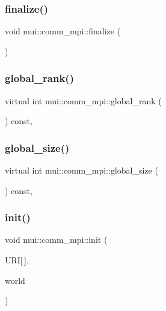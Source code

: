 \subsubsection{\texorpdfstring{finalize()}{finalize()}}
{\footnotesize\ttfamily void mui\+::comm\+\_\+mpi\+::finalize (\begin{DoxyParamCaption}{ }\end{DoxyParamCaption})\hspace{0.3cm}{\ttfamily [inline]}}

\mbox{\label{classmui_1_1comm__mpi_ad2413502326fd78d453978abf96ad9de}} 
\subsubsection{\texorpdfstring{global\+\_\+rank()}{global\_rank()}}
{\footnotesize\ttfamily virtual int mui\+::comm\+\_\+mpi\+::global\+\_\+rank (\begin{DoxyParamCaption}{ }\end{DoxyParamCaption}) const\hspace{0.3cm}{\ttfamily [inline]}, {\ttfamily [virtual]}}

\mbox{\label{classmui_1_1comm__mpi_ad96c274b259a5aa4a4c18882dace97a7}} 
\subsubsection{\texorpdfstring{global\+\_\+size()}{global\_size()}}
{\footnotesize\ttfamily virtual int mui\+::comm\+\_\+mpi\+::global\+\_\+size (\begin{DoxyParamCaption}{ }\end{DoxyParamCaption}) const\hspace{0.3cm}{\ttfamily [inline]}, {\ttfamily [virtual]}}

\mbox{\label{classmui_1_1comm__mpi_a4cb3bd6ed04dfea6bcf8ab8136beafaf}} 
\subsubsection{\texorpdfstring{init()}{init()}}
{\footnotesize\ttfamily void mui\+::comm\+\_\+mpi\+::init (\begin{DoxyParamCaption}\item[{const char}]{U\+RI\mbox{[}$\,$\mbox{]},  }\item[{M\+P\+I\+\_\+\+Comm}]{world }\end{DoxyParamCaption})\hspace{0.3cm}{\ttfamily [inline]}}

